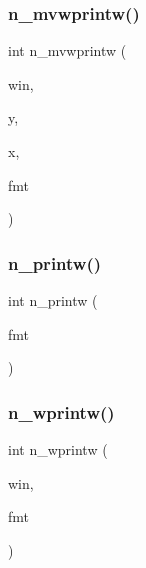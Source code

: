 \mbox{\label{C-macros_8c_a84bbf8649db5247fc4d8f2d7fe3d22a0}} 
\subsubsection{\texorpdfstring{n\+\_\+mvwprintw()}{n\_mvwprintw()}}
{\footnotesize\ttfamily int n\+\_\+mvwprintw (\begin{DoxyParamCaption}\item[{W\+I\+N\+D\+OW $\ast$}]{win,  }\item[{int}]{y,  }\item[{int}]{x,  }\item[{const char $\ast$}]{fmt }\end{DoxyParamCaption})}

\mbox{\label{C-macros_8c_a11be0961dcb0e1af9a31aacb25f54116}} 
\subsubsection{\texorpdfstring{n\+\_\+printw()}{n\_printw()}}
{\footnotesize\ttfamily int n\+\_\+printw (\begin{DoxyParamCaption}\item[{const char $\ast$}]{fmt }\end{DoxyParamCaption})}

\mbox{\label{C-macros_8c_aba52f28e4d247225cd79e21121b88655}} 
\subsubsection{\texorpdfstring{n\+\_\+wprintw()}{n\_wprintw()}}
{\footnotesize\ttfamily int n\+\_\+wprintw (\begin{DoxyParamCaption}\item[{W\+I\+N\+D\+OW $\ast$}]{win,  }\item[{const char $\ast$}]{fmt }\end{DoxyParamCaption})}

